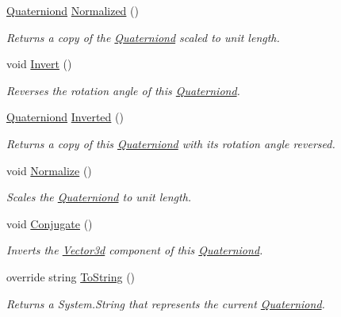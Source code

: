 \begin{DoxyCompactItemize}
\hyperlink{struct_open_t_k_1_1_quaterniond}{Quaterniond} \hyperlink{struct_open_t_k_1_1_quaterniond_a1ad44113a826afafe4664c96446a8e82}{Normalized} ()
\begin{DoxyCompactList}\small\item\em Returns a copy of the \hyperlink{struct_open_t_k_1_1_quaterniond}{Quaterniond} scaled to unit length. \end{DoxyCompactList}\item 
void \hyperlink{struct_open_t_k_1_1_quaterniond_a03a329b2336cbef70733160519b085b7}{Invert} ()
\begin{DoxyCompactList}\small\item\em Reverses the rotation angle of this \hyperlink{struct_open_t_k_1_1_quaterniond}{Quaterniond}. \end{DoxyCompactList}\item 
\hyperlink{struct_open_t_k_1_1_quaterniond}{Quaterniond} \hyperlink{struct_open_t_k_1_1_quaterniond_a7d1148da4d01d90a65334951e8ddce54}{Inverted} ()
\begin{DoxyCompactList}\small\item\em Returns a copy of this \hyperlink{struct_open_t_k_1_1_quaterniond}{Quaterniond} with its rotation angle reversed. \end{DoxyCompactList}\item 
void \hyperlink{struct_open_t_k_1_1_quaterniond_a4430185311f5a7fa97a782f9a10006b6}{Normalize} ()
\begin{DoxyCompactList}\small\item\em Scales the \hyperlink{struct_open_t_k_1_1_quaterniond}{Quaterniond} to unit length. \end{DoxyCompactList}\item 
void \hyperlink{struct_open_t_k_1_1_quaterniond_a9760ac06e29a3ab52d62958057cbbd5b}{Conjugate} ()
\begin{DoxyCompactList}\small\item\em Inverts the \hyperlink{struct_open_t_k_1_1_vector3d}{Vector3d} component of this \hyperlink{struct_open_t_k_1_1_quaterniond}{Quaterniond}. \end{DoxyCompactList}\item 
override string \hyperlink{struct_open_t_k_1_1_quaterniond_a5efa27da965ea0d68c399b47bc3b36de}{To\-String} ()
\begin{DoxyCompactList}\small\item\em Returns a System.\-String that represents the current \hyperlink{struct_open_t_k_1_1_quaterniond}{Quaterniond}. \end{DoxyCompactList}\item 

\end{DoxyCompactItemize}
